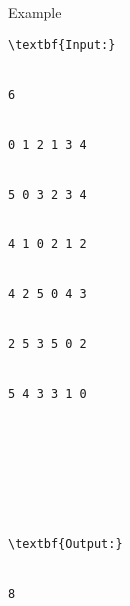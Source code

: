 Example
\begin{verbatim}
\textbf{Input:}


6


0 1 2 1 3 4 


5 0 3 2 3 4 


4 1 0 2 1 2 


4 2 5 0 4 3 


2 5 3 5 0 2 


5 4 3 3 1 0 








\textbf{Output:}


8


\end{verbatim}